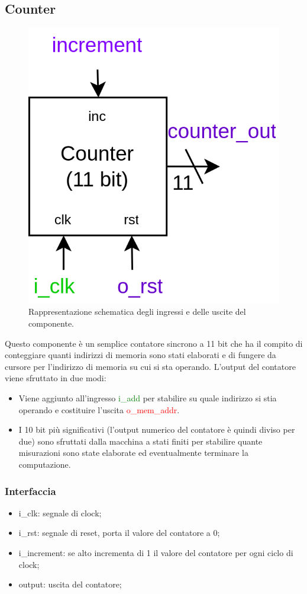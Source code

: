 \documentclass[12pt,a4paper]{scrartcl}
\begin{document}
    \subsection{Counter}
        \begin{figure}[htbp]
            \centering
            \includegraphics[width=0.4\linewidth]{schema-Counter.drawio.png}
            \caption{Rappresentazione schematica degli ingressi e delle uscite del componente.}
            \label{fig:componente}
        \end{figure}
    Questo componente è un semplice contatore sincrono a 11 bit che ha il compito di conteggiare quanti indirizzi di memoria sono stati elaborati e di fungere da cursore per l'indirizzo di memoria su cui si sta operando.
    \newline L'output del contatore viene sfruttato in due modi:
    \begin{itemize}
        \item Viene aggiunto all'ingresso \textcolor{green}{i\_add} per stabilire su quale indirizzo si stia operando e costituire l'uscita \textcolor{red}{o\_mem\_addr}.
        \item I 10 bit più significativi (l'output numerico del contatore è quindi diviso per due) sono sfruttati dalla macchina a stati finiti per stabilire quante misurazioni sono state elaborate ed eventualmente terminare la computazione.
     \end{itemize}
     \subsubsection{Interfaccia}
            \begin{itemize}
                \item i\_clk: segnale di clock;
                \item i\_rst: segnale di reset, porta il valore del contatore a 0;
                \item i\_increment: se alto incrementa di 1 il valore del contatore per ogni ciclo di clock;
                \item output: uscita del contatore;
            \end{itemize}
\end{document}

